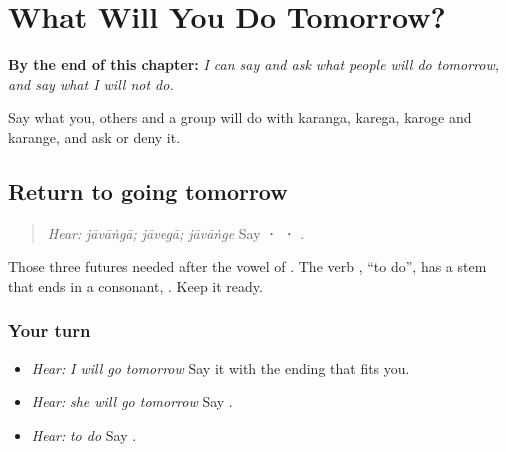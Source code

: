 
\chapter{What Will You Do Tomorrow?}
\label{ch:pa-a2-karanga}

\begin{chapteropening}
\textbf{By the end of this chapter:} \emph{I can say and ask what people will do tomorrow, and say what I will not do.}

Say what you, others and a group will do with karanga, karega, karoge and karange, and ask or deny it.
\end{chapteropening}

\section[\texorpdfstring{\pa{ਜਾਵਾਂਗਾ} · \pa{ਜਾਵੇਗਾ} … (jāvāṅgā · jāvegā …)}{ਜਾਵਾਂਗਾ · ਜਾਵੇਗਾ … (jāvāṅgā · jāvegā …)}]{Return to going tomorrow}

\label{lesson:PA-C222-fut-return}



\begin{quote}
\emph{Hear:} \emph{jāvāṅgā; jāvegā; jāvāṅge} Say \textbf{ ·  · }.
\end{quote}

\begin{grammarlens}[title={Grammar Lens}]
Those three futures needed \textbf{} after the vowel of \textbf{}. The verb \textbf{}, \textquotedblleft{}to do\textquotedblright{}, has a stem that ends in a consonant, \textbf{}. Keep it ready.
\end{grammarlens}

\subsection*{Your turn}
\begin{itemize}
\raggedright
  \item \emph{Hear:} \emph{I will go tomorrow} Say it with the ending that fits you.
  \item \emph{Hear:} \emph{she will go tomorrow} Say \textbf{  }.
  \item \emph{Hear:} \emph{to do} Say \textbf{}.
\end{itemize}

